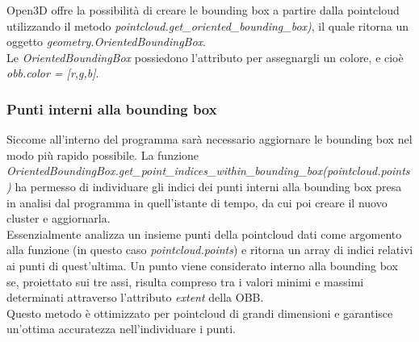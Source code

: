\documentclass[italian]{article}
\begin{document}
Open3D offre la possibilità di creare le bounding box a partire dalla pointcloud utilizzando il metodo \textit{pointcloud.get\_oriented\_bounding\_box)}, il quale ritorna un oggetto
\textit{geometry.OrientedBoundingBox}.\\
Le \textit{OrientedBoundingBox} possiedono l'attributo per assegnargli un colore, e cioè \textit{obb.color = [r,g,b]}.
\subsubsection*{Punti interni alla bounding box}
Siccome all'interno del programma sarà necessario aggiornare le bounding box nel modo più rapido possibile. La funzione\\ \textit{OrientedBoundingBox.get\_point\_indices\_within\_bounding\_box(pointcloud.points)} ha permesso di individuare gli indici dei punti interni alla bounding box presa in analisi dal programma in quell'istante di tempo, da cui poi creare il nuovo cluster e aggiornarla.\\ 
Essenzialmente analizza un insieme punti della pointcloud dati come argomento alla funzione (in questo caso \textit{pointcloud.points}) e ritorna un array di indici relativi ai punti di quest'ultima. Un punto viene considerato interno alla bounding box se, proiettato sui tre assi, risulta compreso tra i valori minimi e massimi determinati attraverso l'attributo \textit{extent} della OBB.\\
Questo metodo è ottimizzato per pointcloud di grandi dimensioni e garantisce un'ottima accuratezza nell'individuare i punti.
\end{document}

